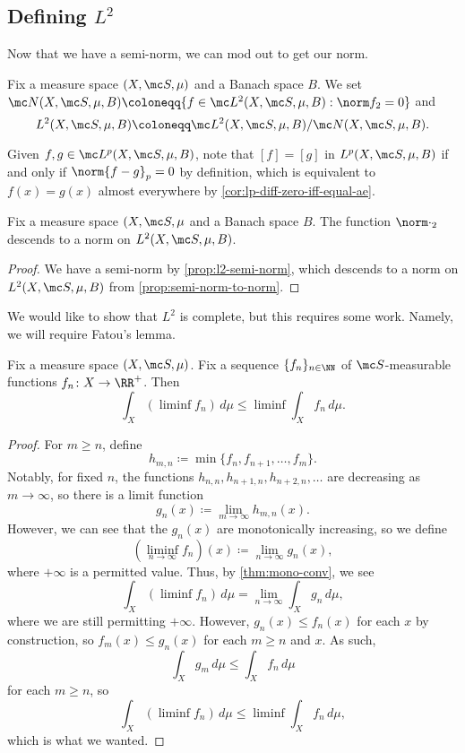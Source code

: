 \documentclass[../notes.tex]{subfiles}
\begin{document}
\subsection{Defining \texorpdfstring{$L^2$}{ L2}}
Now that we have a semi-norm, we can mod out to get our norm.
\begin{notation}
	Fix a measure space $(X,\mc S,\mu)$ and a Banach space $B$. We set $\mc N(X,\mc S,\mu,B)\coloneqq\{f\in\mc L^2(X,\mc S,\mu,B):\norm f_2=0\}$ and
	\[L^2(X,\mc S,\mu,B)\coloneqq\mc L^2(X,\mc S,\mu,B)/\mc N(X,\mc S,\mu,B).\]
\end{notation}
\begin{remark}
	Given $f,g\in\mc L^p(X,\mc S,\mu,B)$, note that $[f]=[g]$ in $L^p(X,\mc S,\mu,B)$ if and only if $\norm{f-g}_p=0$ by definition, which is equivalent to $f(x)=g(x)$ almost everywhere by \autoref{cor:lp-diff-zero-iff-equal-ae}.
\end{remark}
\begin{proposition}
	Fix a measure space $(X,\mc S,\mu$ and a Banach space $B$. The function $\norm\cdot_2$ descends to a norm on $L^2(X,\mc S,\mu,B)$.
\end{proposition}
\begin{proof}
	We have a semi-norm by \autoref{prop:l2-semi-norm}, which descends to a norm on $L^2(X,\mc S,\mu,B)$ from \autoref{prop:semi-norm-to-norm}.
\end{proof}
We would like to show that $L^2$ is complete, but this requires some work. Namely, we will require Fatou's lemma.
\begin{lemma}[Fatou]
	Fix a measure space $(X,\mc S,\mu)$. Fix a sequence $\{f_n\}_{n\in\NN}$ of $\mc S$-measurable functions $f_n\colon X\to\RR^+$. Then
	\[\int_X(\liminf f_n)\,d\mu\le\liminf\int_Xf_n\,d\mu.\]
\end{lemma}
\begin{proof}
	For $m\ge n$, define
	\[h_{m,n}\coloneqq\min\{f_n,f_{n+1},\ldots,f_m\}.\]
	Notably, for fixed $n$, the functions $h_{n,n},h_{n+1,n},h_{n+2,n},\ldots$ are decreasing as $m\to\infty$, so there is a limit function
	\[g_n(x)\coloneqq\lim_{m\to\infty}h_{m,n}(x).\]
	However, we can see that the $g_n(x)$ are monotonically increasing, so we define
	\[\left(\liminf_{n\to\infty}f_n\right)(x)\coloneqq\lim_{n\to\infty}g_n(x),\]
	where $+\infty$ is a permitted value. Thus, by \autoref{thm:mono-conv}, we see
	\[\int_X(\liminf f_n)\,d\mu=\lim_{n\to\infty}\int_Xg_n\,d\mu,\]
	where we are still permitting $+\infty$. However, $g_n(x)\le f_n(x)$ for each $x$ by construction, so $f_m(x)\le g_n(x)$ for each $m\ge n$ and $x$. As such,
	\[\int_Xg_m\,d\mu\le\int_Xf_n\,d\mu\]
	for each $m\ge n$, so
	\[\int_X(\liminf f_n)\,d\mu\le\liminf\int_Xf_n\,d\mu,\]
	which is what we wanted.
\end{proof}
\end{document}
